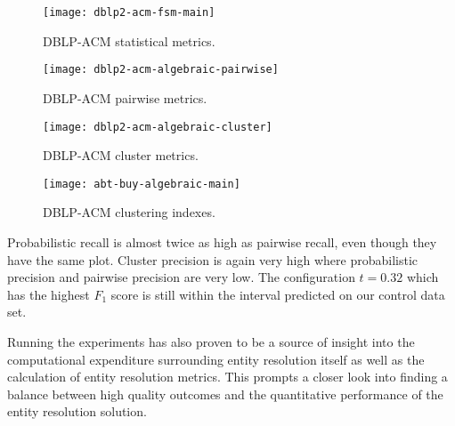 \begin{figure*}[htbp]
    \begin{minipage}{0.24\textwidth}
        \centering
        \texttt{[image: dblp2-acm-fsm-main]}
        \caption{DBLP-ACM statistical metrics.}\label{fig:dblp2-acm-fsm-main}
    \end{minipage}
    \begin{minipage}{0.24\textwidth}
        \centering
        \texttt{[image: dblp2-acm-algebraic-pairwise]}
        \caption{DBLP-ACM pairwise metrics.}\label{fig:dblp2-acm-algebraic-pairwise}
    \end{minipage}
    \begin{minipage}{0.24\textwidth}
        \centering
        \texttt{[image: dblp2-acm-algebraic-cluster]}
        \caption{DBLP-ACM cluster metrics.}\label{fig:dblp2-acm-algebraic-cluster}
    \end{minipage}
    \begin{minipage}{0.24\textwidth}
        \centering
        \texttt{[image: abt-buy-algebraic-main]}
        \caption{DBLP-ACM clustering indexes.}
        \label{fig:dblp2-acm-algebraic-main}
    \end{minipage}
\end{figure*}\label{dblp2-acm}

Probabilistic recall is almost twice as high as pairwise recall, even though
they have the same plot.
Cluster precision is again very high where probabilistic precision and
pairwise precision are very low.
The configuration $t=0.32$ which has the highest $F_1$ score is still within the
interval predicted on our control data set.

Running the experiments has also proven to be a source of insight into the
computational expenditure surrounding entity resolution itself as well as the
calculation of entity resolution metrics.
This prompts a closer look into finding a balance between high quality outcomes
and the quantitative performance of the entity resolution solution.